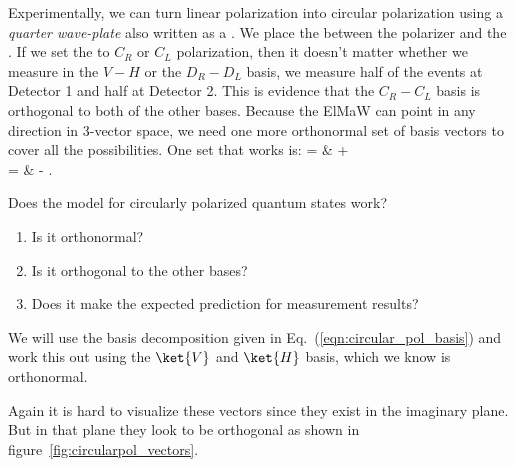 Experimentally, we can turn linear polarization into circular polarization using a {\em quarter wave-plate} also written as a \qwp. We place the \qwp  between the polarizer and the \hwp. If we set the \qwp to $C_R$ or $C_L$ polarization, then it doesn't matter whether we measure in the $V-H$ or the $D_R-D_L$ basis, we measure half of the events at Detector 1 and half at Detector 2. This is evidence that the $C_R-C_L$ basis is orthogonal to both of the other bases. Because the ElMaW can point in any direction in 3-vector space, we need one more orthonormal set of basis vectors to cover all the possibilities. One set that works is:
\bas
{} = &  + \frac{\I}{\stwo} \\
 = &  - \frac{\I}{\stwo}.
\label{eqn:circular_pol_basis}
\eas
%
\begin{example}
Does the model for circularly polarized quantum states work? 
\begin{enumerate}
\item Is it orthonormal?
\item Is it orthogonal to the other bases?
\item Does it make the expected prediction for measurement results?
\end{enumerate}

\model We will use the basis decomposition given in Eq.~(\ref{eqn:circular_pol_basis}) and work this out using the $\ket{V}$ and $\ket{H}$ basis, which we know is orthonormal.
\begin{marginfigure}
\centering
{}
\caption{ }
\label{fig:circularpol_vectors}
\end{marginfigure}

\vis Again it is hard to visualize these vectors since they exist in the imaginary plane. But in that plane they look to be orthogonal as shown in figure~\ref{fig:circularpol_vectors}.


\end{example}
